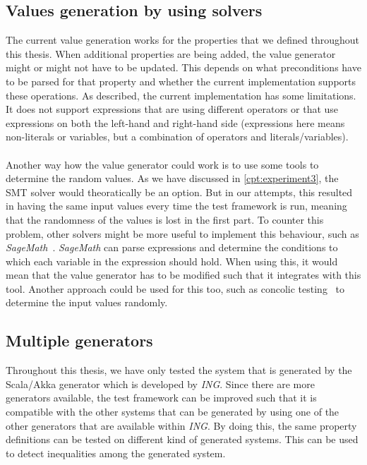 \subsection*{Values generation by using solvers}
The current value generation works for the properties that we defined throughout this thesis. When additional properties are being added, the value generator might or might not have to be updated. This depends on what preconditions have to be parsed for that property and whether the current implementation supports these operations. As described, the current implementation has some limitations. It does not support expressions that are using different operators or that use expressions on both the left-hand and right-hand side (expressions here means non-literals or variables, but a combination of operators and literals/variables).\\
\\
Another way how the value generator could work is to use some tools to determine the random values. As we have discussed in \autoref{cpt:experiment3}, the SMT solver would theoratically be an option. But in our attempts, this resulted in having the same input values every time the test framework is run, meaning that the randomness of the values is lost in the first part. To counter this problem, other solvers might be more useful to implement this behaviour, such as \textit{SageMath}~\cite{siteSageMath2017}. \textit{SageMath} can parse expressions and determine the conditions to which each variable in the expression should hold. When using this, it would mean that the value generator has to be modified such that it integrates with this tool. Another approach could be used for this too, such as concolic testing~\cite{sen2006cute} to determine the input values randomly. %

\subsection*{Multiple generators}
Throughout this thesis, we have only tested the system that is generated by
the Scala/Akka generator which is developed by \textit{ING}. Since there are
more generators available, the test framework can be improved such that it is
compatible with the other systems that can be generated by using one of the
other generators that are available within \textit{ING}. By doing this, the same
property definitions can be tested on different kind of generated systems. This
can be used to detect inequalities among the generated system.

